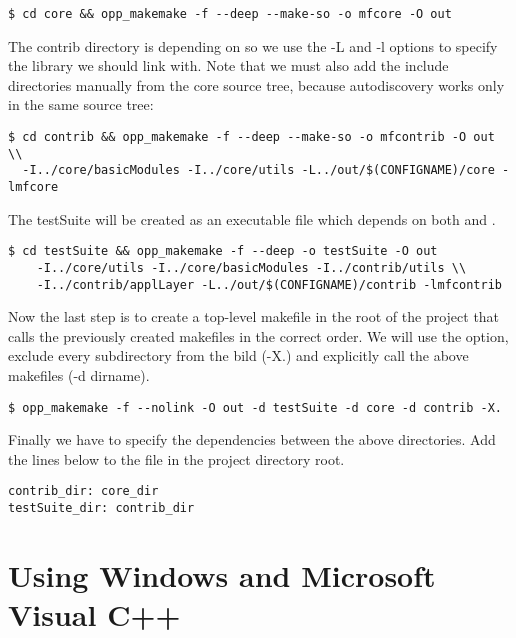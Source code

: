 \begin{verbatim}
$ cd core && opp_makemake -f --deep --make-so -o mfcore -O out
\end{verbatim}

The contrib directory is depending on  so we use the -L and -l options
to specify the library we should link with. Note that we must also add
the include directories manually from the core source tree, because autodiscovery works only
in the same source tree:

\begin{verbatim}
$ cd contrib && opp_makemake -f --deep --make-so -o mfcontrib -O out \\
  -I../core/basicModules -I../core/utils -L../out/$(CONFIGNAME)/core -lmfcore
\end{verbatim}

The testSuite will be created as an executable file which depends on both
 and .

\begin{verbatim}
$ cd testSuite && opp_makemake -f --deep -o testSuite -O out 
    -I../core/utils -I../core/basicModules -I../contrib/utils \\
    -I../contrib/applLayer -L../out/$(CONFIGNAME)/contrib -lmfcontrib
\end{verbatim}

Now the last step is to create a top-level makefile in the root of the project that
calls the previously created makefiles in the correct order. We will use the
 option, exclude every subdirectory from the bild (-X.) and explicitly call
the above makefiles (-d dirname).

\begin{verbatim}
$ opp_makemake -f --nolink -O out -d testSuite -d core -d contrib -X.
\end{verbatim}

Finally we have to specify the dependencies between the above directories. Add the lines below 
to the  file in the project directory root.

\begin{verbatim}
contrib_dir: core_dir
testSuite_dir: contrib_dir
\end{verbatim}

\ifcommercial
\section{Using Windows and Microsoft Visual C++}

